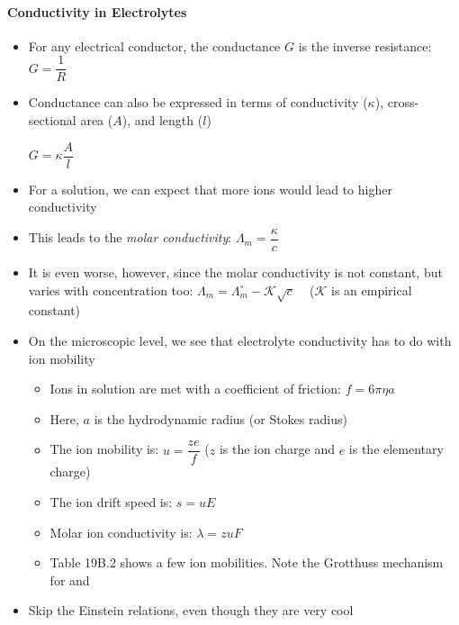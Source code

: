 \documentclass[12pt, openany, letterpaper]{memoir}
\begin{document}
\paragraph*{Conductivity in Electrolytes}
\begin{itemize}
	\item For any electrical conductor, the conductance $G$ is the inverse resistance: $G=\dfrac{1}{R}$
	\item Conductance can also be expressed in terms of conductivity ($\kappa$), cross-sectional area ($A$), and length ($l$)

	      $G=\kappa\dfrac{A}{l}$
	\item For a solution, we can expect that more ions would lead to higher conductivity
	\item This leads to the \emph{molar conductivity}: $\Lambda_m=\dfrac{\kappa}{c}$
	\item It is even worse, however, since the molar conductivity is not constant, but varies with concentration too: $\Lambda_m = \Lambda_m^\circ-\mathcal{K}\sqrt{c}$ ~ ($\mathcal{K}$ is an empirical constant)
	\item On the microscopic level, we see that electrolyte conductivity has to do with ion mobility
	      \begin{itemize}
		      \item Ions in solution are met with a coefficient of friction: $f=6\pi\eta a$
		      \item Here, $a$ is the hydrodynamic radius (or Stokes radius)
		      \item The ion mobility is: $u = \dfrac{ze}{f}$ ($z$ is the ion charge and $e$ is the elementary charge)
		      \item The ion drift speed is: $s = uE$
		      \item Molar ion conductivity is: $\lambda=zuF$
		      \item Table 19B.2 shows a few ion mobilities. Note the Grotthuss mechanism for  and 
	      \end{itemize}
	\item Skip the Einstein relations, even though they are very cool
\end{itemize}
\end{document}
